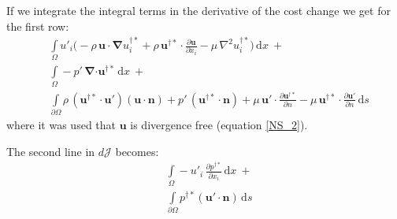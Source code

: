 \documentclass[12pt, a4paper]{article}
\begin{document}
    If we integrate the integral terms in the derivative of the cost change we get for the first row:
    \begin{equation}
    \begin{split}
        &\int\limits_{\Omega} u'_i \bigg( 
            -\rho \, \mathbf{u \cdot} \boldsymbol{\nabla} u^{\dagger *}_i + 
            \rho \, \mathbf{u^{\dagger *} \cdot} \frac{\partial \mathbf{u}}{\partial x_i} - 
            \mu \, \nabla^2 u^{\dagger *}_i
        \bigg) \, \mathrm{d} x \ + \\
        &\int\limits_{\Omega} 
            - p' \, \boldsymbol{\nabla} \mathbf{\cdot u^{\dagger *}}
        \, \mathrm{d} x \ + \\
        &\int\limits_{\partial \Omega}
            \rho \, (\mathbf{u^{\dagger *} \cdot u'}) (\mathbf{u \cdot n}) + 
            p' \, (\mathbf{u^{\dagger *} \cdot n}) + 
            \mu \, \mathbf{u' \cdot} \frac{\partial \mathbf{u^{\dagger *}}}{\partial n} - 
            \mu \, \mathbf{u^{\dagger *} \cdot} \frac{\partial \mathbf{u'}}{\partial n}
            \, \mathrm{d} s
    \end{split}
    \end{equation}
    where it was used that $\mathbf{u}$ is divergence free (equation \ref{NS_2}).
    
    The second line in $d \mathcal{J}$ becomes:
    \begin{equation}
    \begin{split}
        &\int\limits_{\Omega}
            - u'_i \, \frac{\partial p^{\dagger *}}{\partial x_i}
        \, \mathrm{d} x \ + \\
        &\int\limits_{\partial \Omega}
            p^{\dagger *} (\mathbf{u' \cdot n})
        \, \mathrm{d} s
    \end{split}
    \end{equation}
    
\end{document}
